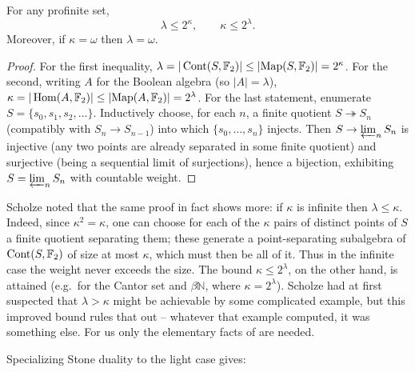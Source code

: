 \begin{proposition}
\label{prop:2:size-weight-ineq}
For any profinite set,
\begin{equation*}
\lambda\le 2^{\kappa},\qquad \kappa\le 2^{\lambda}.
\end{equation*}
Moreover, if $\kappa=\omega$ then $\lambda=\omega$.
\end{proposition}

\begin{proof}
For the first inequality, $\lambda=|\operatorname{Cont}(S,\mathbb{F}_2)|\le
|\mathrm{Map}(S,\mathbb{F}_2)|=2^{\kappa}$. For the second, writing $A$ for the
Boolean algebra (so $|A|=\lambda$),
$\kappa=|\operatorname{Hom}(A,\mathbb{F}_2)|\le|\mathrm{Map}(A,\mathbb{F}_2)|=2^{\lambda}$.
For the last statement, enumerate $S=\{s_0,s_1,s_2,\dots\}$. Inductively choose,
for each $n$, a finite quotient $S\twoheadrightarrow S_n$ (compatibly with
$S_n\to S_{n-1}$) into which $\{s_0,\dots,s_n\}$ injects. Then $S\to
\varprojlim_n S_n$ is injective (any two points are already separated in some
finite quotient) and surjective (being a sequential limit of surjections), hence
a bijection, exhibiting $S=\varprojlim_n S_n$ with countable weight.
\end{proof}

\begin{remark}
\label{rmk:2:gabber}
Scholze noted that the same proof in fact shows more: if $\kappa$ is infinite
then $\lambda\le\kappa$. Indeed, since $\kappa^2=\kappa$, one can choose for each
of the $\kappa$ pairs of distinct points of $S$ a finite quotient separating
them; these generate a point-separating subalgebra of $\operatorname{Cont}(S,\mathbb{F}_2)$ of
size at most $\kappa$, which must then be all of it. Thus in the infinite case the
weight never exceeds the size. The bound $\kappa\le 2^{\lambda}$, on the other
hand, is attained (e.g.\ for the Cantor set and $\beta\mathbb{N}$, where
$\kappa=2^{\lambda}$). Scholze had at first suspected that $\lambda>\kappa$ might
be achievable by some complicated example, but this improved bound rules that out
-- whatever that example computed, it was something else. For us only the
elementary facts of  are needed.
\end{remark}

Specializing Stone duality to the light case gives:

